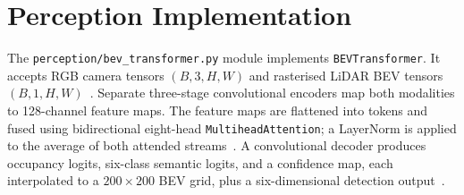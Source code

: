 \documentclass[12pt, a4paper]{article}
\begin{document}
\section{Perception Implementation}

The \texttt{perception/bev\_transformer.py} module implements \texttt{BEVTransformer}.
It accepts RGB camera tensors $(B,3,H,W)$ and rasterised LiDAR BEV tensors
$(B,1,H,W)$~\cite{ref234}. Separate three-stage convolutional encoders map both
modalities to 128-channel feature maps. The feature maps are flattened into tokens and
fused using bidirectional eight-head \texttt{MultiheadAttention}; a LayerNorm is applied
to the average of both attended streams~\cite{ref234}. A convolutional decoder produces
occupancy logits, six-class semantic logits, and a confidence map, each interpolated to a
$200\!\times\!200$ BEV grid, plus a six-dimensional detection output~\cite{ref234}.
\end{document}

